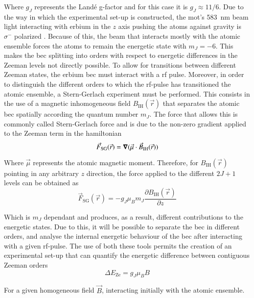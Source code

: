 Where $g_J$ represents the Landé g-factor and for this case it is $g_J\approx11/6$. Due to the way in which the experimental set-up is constructed, the \ac{mot}'s \SI{583}{\nano\meter} beam light interacting with erbium in the $z$ axis pushing the atoms against gravity  is $\sigma^-$ polarized \cite{Ulitzsch2016}. Because of this, the beam that interacts mostly with the atomic ensemble forces the atoms to remain the energetic state with $m_J = -6$. This makes the \ac{bec} splitting into orders with respect to energetic differences in the Zeeman levels not directly possible. To allow for transitions between different Zeeman states, the erbium \ac{bec} must interact with a \acf{rf} pulse. Moreover, in order to distinguish the different orders to which the \ac{rf}-pulse has transitioned the atomic ensemble, a Stern-Gerlach experiment must be performed. This consists in the use of a magnetic inhomogeneous field $B_\text{IH}(\vec{r})$ that separates the atomic \ac{bec} spatially according the quantum number $m_J$. The force that allows this is commonly called Stern-Gerlach force and is due to the non-zero gradient applied to the Zeeman term in the hamiltonian \cite{Foot2005}
\begin{equation}
	\vec{F}_\text{SG}(\vec{r}) = \grad{(\vec{\mu}\cdot\vec{B}_\text{IH}(\vec{r}))}
\end{equation}

Where $\vec{\mu}$ represents the atomic magnetic moment. Therefore, for $B_\text{IH}(\vec{r})$ pointing in any arbitrary $z$ direction, the force applied to the different $2J+1$ levels can be obtained as
\begin{equation}
	\vec{F}_\text{SG}(\vec{r}) = - g_J \mu_B m_J \frac{\partial B_\text{IH}(\vec{r})}{\partial z}
\end{equation}

Which is $m_J$ dependant and produces, as a result, different contributions to the energetic states. Due to this, it will be possible to separate the \ac{bec} in different orders, and analyse the internal energetic behaviour of the \ac{bec} after interacting with a given \ac{rf}-pulse. The use of both these tools permits the creation of an experimental set-up that can quantify the energetic difference between contiguous Zeeman orders
\begin{equation}
\Delta E_\text{Ze} = g_J \mu_B B
\end{equation}

For a given homogeneous field $\vec{B}$, interacting initially with the atomic ensemble.


